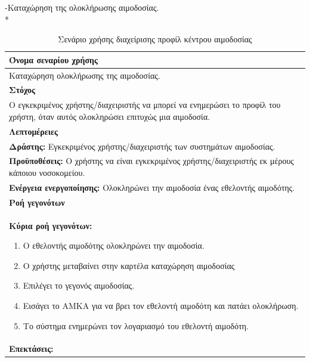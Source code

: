 \newpage
-Καταχώρηση της ολοκλήρωσης αιμοδοσίας.
\\*	

\begin{table}[H]
	\begin{center}
	    \begin{tabular}{|p{\dimexpr \linewidth-2\tabcolsep}|}
	    \hline
	    \rowcolor{grayy}
	    \textbf{Όνομα σεναρίου χρήσης}
	    \\ \hline    
	    Καταχώρηση ολοκλήρωσης της αιμοδοσίας.
	     \\ \hline
	    \rowcolor{grayy}
	    \textbf{\textbf{Στόχος}}
	    \\ \hline
	 	 Ο εγκεκριμένος χρήστης/διαχειριστής να μπορεί να ενημερώσει το προφίλ του χρήστη, όταν αυτός ολοκληρώσει επιτυχώς μια αιμοδοσία.
	    \\ \hline
	    \rowcolor{grayy}
	    \textbf{Λεπτομέρειες}
	    \\ \hline
		\textbf{Δράστης:} Εγκεκριμένος χρήστης/διαχειριστής των συστημάτων αιμοδοσίας.
		\\*
		\textbf{Προϋποθέσεις:} Ο χρήστης να είναι εγκεκριμένος χρήστης/διαχειριστής εκ μέρους κάποιου νοσοκομείου.
		\\
		\textbf{Ενέργεια ενεργοποίησης:} Ολοκληρώνει την αιμοδοσία ένας εθελοντής αιμοδότης.
	    \\ \hline
		\rowcolor{grayy}    
	    \textbf{Ροή γεγονότων}
	    \\ \hline
		\textbf{Κύρια ροή γεγονότων:}
		\begin{enumerate}
			\item	 Ο εθελοντής αιμοδότης ολοκληρώνει την αιμοδοσία.
			\item Ο χρήστης μεταβαίνει στην καρτέλα καταχώρηση αιμοδοσίας
			\item Επιλέγει το γεγονός αιμοδοσίας.
			\item Εισάγει το ΑΜΚΑ για να βρει τον εθελοντή αιμοδότη και πατάει ολοκλήρωση.
			\item Το σύστημα ενημερώνει τον λογαριασμό του εθελοντή αιμοδότη.
		\end{enumerate}
		\\ \hline
		\rowcolor{grayy}
		\textbf{Επεκτάσεις:}
		   \\ \hline
	    \end{tabular}
	    \caption{Σενάριο χρήσης διαχείρισης προφίλ κέντρου αιμοδοσίας}
	    \label{tab:add_completed_blood_donation}
	\end{center}
\end{table}	

